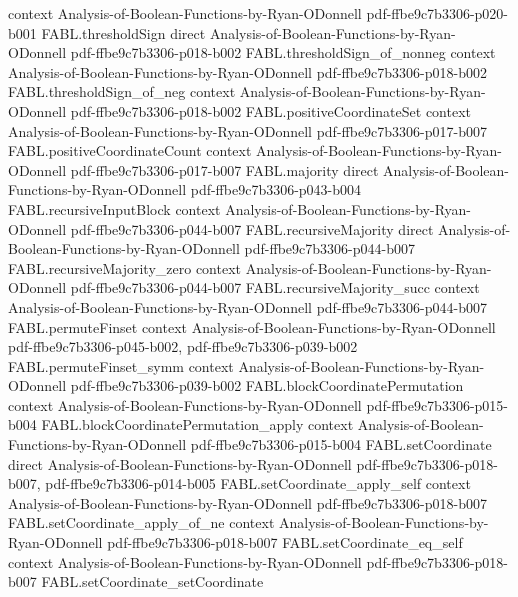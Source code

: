 \begin{theorem}
  {context}
  {Analysis-of-Boolean-Functions-by-Ryan-ODonnell}
  {pdf-ffbe9c7b3306-p020-b001}
\proofstep
  {FABL.thresholdSign}
  {direct}
  {Analysis-of-Boolean-Functions-by-Ryan-ODonnell}
  {pdf-ffbe9c7b3306-p018-b002}
\proofstep
  {FABL.thresholdSign_of_nonneg}
  {context}
  {Analysis-of-Boolean-Functions-by-Ryan-ODonnell}
  {pdf-ffbe9c7b3306-p018-b002}
\proofstep
  {FABL.thresholdSign_of_neg}
  {context}
  {Analysis-of-Boolean-Functions-by-Ryan-ODonnell}
  {pdf-ffbe9c7b3306-p018-b002}
\proofstep
  {FABL.positiveCoordinateSet}
  {context}
  {Analysis-of-Boolean-Functions-by-Ryan-ODonnell}
  {pdf-ffbe9c7b3306-p017-b007}
\proofstep
  {FABL.positiveCoordinateCount}
  {context}
  {Analysis-of-Boolean-Functions-by-Ryan-ODonnell}
  {pdf-ffbe9c7b3306-p017-b007}
\proofstep
  {FABL.majority}
  {direct}
  {Analysis-of-Boolean-Functions-by-Ryan-ODonnell}
  {pdf-ffbe9c7b3306-p043-b004}
\proofstep
  {FABL.recursiveInputBlock}
  {context}
  {Analysis-of-Boolean-Functions-by-Ryan-ODonnell}
  {pdf-ffbe9c7b3306-p044-b007}
\proofstep
  {FABL.recursiveMajority}
  {direct}
  {Analysis-of-Boolean-Functions-by-Ryan-ODonnell}
  {pdf-ffbe9c7b3306-p044-b007}
\proofstep
  {FABL.recursiveMajority_zero}
  {context}
  {Analysis-of-Boolean-Functions-by-Ryan-ODonnell}
  {pdf-ffbe9c7b3306-p044-b007}
\proofstep
  {FABL.recursiveMajority_succ}
  {context}
  {Analysis-of-Boolean-Functions-by-Ryan-ODonnell}
  {pdf-ffbe9c7b3306-p044-b007}
\proofstep
  {FABL.permuteFinset}
  {context}
  {Analysis-of-Boolean-Functions-by-Ryan-ODonnell}
  {pdf-ffbe9c7b3306-p045-b002,
    pdf-ffbe9c7b3306-p039-b002}
\proofstep
  {FABL.permuteFinset_symm}
  {context}
  {Analysis-of-Boolean-Functions-by-Ryan-ODonnell}
  {pdf-ffbe9c7b3306-p039-b002}
\proofstep
  {FABL.blockCoordinatePermutation}
  {context}
  {Analysis-of-Boolean-Functions-by-Ryan-ODonnell}
  {pdf-ffbe9c7b3306-p015-b004}
\proofstep
  {FABL.blockCoordinatePermutation_apply}
  {context}
  {Analysis-of-Boolean-Functions-by-Ryan-ODonnell}
  {pdf-ffbe9c7b3306-p015-b004}
\proofstep
  {FABL.setCoordinate}
  {direct}
  {Analysis-of-Boolean-Functions-by-Ryan-ODonnell}
  {pdf-ffbe9c7b3306-p018-b007,
    pdf-ffbe9c7b3306-p014-b005}
\proofstep
  {FABL.setCoordinate_apply_self}
  {context}
  {Analysis-of-Boolean-Functions-by-Ryan-ODonnell}
  {pdf-ffbe9c7b3306-p018-b007}
\proofstep
  {FABL.setCoordinate_apply_of_ne}
  {context}
  {Analysis-of-Boolean-Functions-by-Ryan-ODonnell}
  {pdf-ffbe9c7b3306-p018-b007}
\proofstep
  {FABL.setCoordinate_eq_self}
  {context}
  {Analysis-of-Boolean-Functions-by-Ryan-ODonnell}
  {pdf-ffbe9c7b3306-p018-b007}
\proofstep
  {FABL.setCoordinate_setCoordinate}

\end{theorem}
